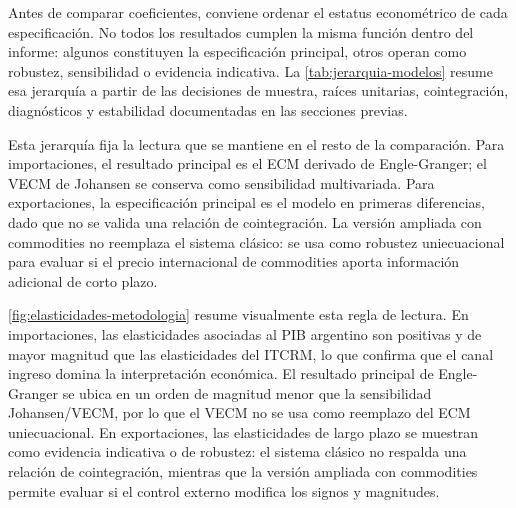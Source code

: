 \documentclass[11pt,a4paper]{article}
\begin{document}
	Antes de comparar coeficientes, conviene ordenar el estatus econométrico de
	cada especificación. No todos los resultados cumplen la misma función dentro
	del informe: algunos constituyen la especificación principal, otros operan como
	robustez, sensibilidad o evidencia indicativa. La \autoref{tab:jerarquia-modelos}
	resume esa jerarquía a partir de las decisiones de muestra, raíces unitarias,
	cointegración, diagnósticos y estabilidad documentadas en las secciones
	previas.
	
	\begin{table}[H]
		\centering
		\caption{Jerarquía final de modelos por flujo comercial.}
		\label{tab:jerarquia-modelos}
		\scriptsize
		\caption*{\footnotesize Nota: ``exportaciones con commodities'' no define un
			tercer sistema; es una especificación ampliada del sistema de exportaciones
			usada como robustez con control externo. La tabla resume la jerarquía del
			archivo .}
	\end{table}
	
	Esta jerarquía fija la lectura que se mantiene en el resto de la comparación.
	Para importaciones, el resultado principal es el ECM derivado de
	Engle-Granger; el VECM de Johansen se conserva como sensibilidad multivariada.
	Para exportaciones, la especificación principal es el modelo en primeras
	diferencias, dado que no se valida una relación de cointegración. La versión
	ampliada con commodities no reemplaza el sistema clásico: se usa como robustez
	uniecuacional para evaluar si el precio internacional de commodities aporta
	información adicional de corto plazo.

	\autoref{fig:elasticidades-metodologia} resume visualmente esta regla de
	lectura. En importaciones, las elasticidades asociadas al PIB argentino son
	positivas y de mayor magnitud que las elasticidades del ITCRM, lo que confirma
	que el canal ingreso domina la interpretación económica. El resultado principal
	de Engle-Granger se ubica en un orden de magnitud menor que la sensibilidad
	Johansen/VECM, por lo que el VECM no se usa como reemplazo del ECM
	uniecuacional. En exportaciones, las elasticidades de largo plazo se muestran
	como evidencia indicativa o de robustez: el sistema clásico no respalda una
	relación de cointegración, mientras que la versión ampliada con commodities
	permite evaluar si el control externo modifica los signos y magnitudes.
\end{document}
